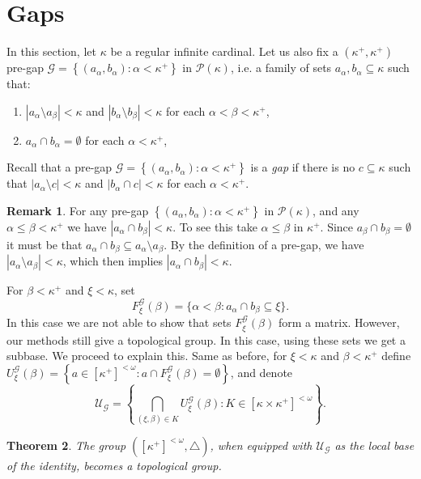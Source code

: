 \documentclass{amsart}
\theoremstyle{plain}
\newtheorem{theorem}{Theorem}[section]
\theoremstyle{definition}
\newtheorem{remark}[theorem]{Remark}
\numberwithin{equation}{section}
\renewcommand{\a}{\alpha}
\renewcommand{\b}{\beta}
\renewcommand{\k}{\kappa}
\renewcommand{\o}{\omega}
\newcommand{\ps}{\emptyset}
\newcommand{\sst}{\subseteq}
\newcommand{\cu}{\mathcal U}
\newcommand{\set}[1]{\left\{#1\right\}}
\newcommand{\abs}[1]{\left\vert#1\right\vert}
\begin{document}
\section{Gaps}\label{s:gaps}

In this section, let $\k$ be a regular infinite cardinal.
Let us also fix a $(\k^+,\k^+)$ pre-gap $\mathcal G=\set{(a_{\a},b_{\a}):\a<\k^+}$ in $\mathcal P(\k)$, i.e. a family of sets $a_{\a},b_{\a}\sst\k$ such that:
\begin{enumerate}
	\item $\abs{a_{\a}\setminus a_{\b}}<\k$ and $\abs{b_{\a}\setminus b_{\b}}<\k$ for each $\a<\b<\k^+$,
	\item $a_{\a}\cap b_{\a}=\ps$ for each $\a<\k^+$,
\end{enumerate}

Recall that a pre-gap $\mathcal G=\set{(a_{\a},b_{\a}):\a<\k^+}$ is a \emph{gap} if there is no $c\sst\k$ such that $\abs{a_{\a}\setminus c}<\k$ and $\abs{b_{\a}\cap c}<\k$ for each $\a<\k^+$.

\begin{remark}\label{r:pregap}
	For any pre-gap $\set{(a_{\a},b_{\a}):\a<\k^+}$ in $\mathcal P(\k)$, and any $\a\le\b<\k^+$ we have $\abs{a_{\a}\cap b_{\b}}<\k$.
	To see this take $\a\le\b$ in $\k^+$.
	Since $a_{\b}\cap b_{\b}=\ps$ it must be that $a_{\a}\cap b_{\b}\sst a_{\a}\setminus a_{\b}$.
	By the definition of a pre-gap, we have $\abs{a_{\a}\setminus a_{\b}}<\k$, which then implies $\abs{a_{\a}\cap b_{\b}}<\k$.
\end{remark}

For $\b < \k^+$ and $\xi < \k$, set
$$
F^{\mathcal G}_{\xi}(\b) = \{\a < \b: a_{\a} \cap b_{\b} \sst \xi\}.
$$
In this case we are not able to show that sets $F^{\mathcal G}_{\xi}(\b)$ form a matrix.
However, our methods still give a topological group.
In this case, using these sets we get a subbase.
We proceed to explain this.
Same as before, for $\xi<\k$ and $\b<\k^+$ define $U^{\mathcal G}_{\xi}(\b) = \set{a \in [\k^+]^{<\o}: a \cap F^{\mathcal G}_{\xi}(\b) = \ps}$, and denote $$\textstyle\mathcal U_{\mathcal G}=\set{\bigcap_{(\xi,\b)\in K}U^{\mathcal G}_{\xi}(\b):K\in \left[\k\times\k^+\right]^{<\o}}.$$

\begin{theorem}
	\label{t:gap-group}
	The group $([\k^+]^{<\o}, \triangle)$, when equipped with $\cu_{\mathcal G}$ as the local base of the identity, becomes a topological group.
\end{theorem}
\end{document}
